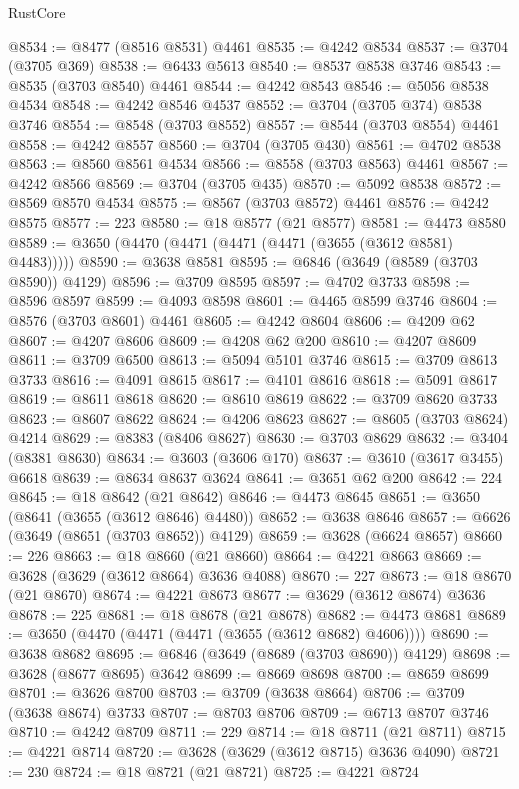 \begin{lexlean}{RustCore}
\begin{coremodule}
@8534 := @8477 (@8516 @8531) @4461
@8535 := @4242 @8534
@8537 := @3704 (@3705 @369)
@8538 := @6433 @5613
@8540 := @8537 @8538 @3746
@8543 := @8535 (@3703 @8540) @4461
@8544 := @4242 @8543
@8546 := @5056 @8538 @4534
@8548 := @4242 @8546 @4537
@8552 := @3704 (@3705 @374) @8538 @3746
@8554 := @8548 (@3703 @8552)
@8557 := @8544 (@3703 @8554) @4461
@8558 := @4242 @8557
@8560 := @3704 (@3705 @430)
@8561 := @4702 @8538
@8563 := @8560 @8561 @4534
@8566 := @8558 (@3703 @8563) @4461
@8567 := @4242 @8566
@8569 := @3704 (@3705 @435)
@8570 := @5092 @8538
@8572 := @8569 @8570 @4534
@8575 := @8567 (@3703 @8572) @4461
@8576 := @4242 @8575
@8577 := 223
@8580 := @18 @8577 (@21 @8577)
@8581 := @4473 @8580
@8589 := @3650 (@4470 (@4471 (@4471 (@4471 (@3655 (@3612 @8581) @4483)))))
@8590 := @3638 @8581
@8595 := @6846 (@3649 (@8589 (@3703 @8590)) @4129)
@8596 := @3709 @8595
@8597 := @4702 @3733
@8598 := @8596 @8597
@8599 := @4093 @8598
@8601 := @4465 @8599 @3746
@8604 := @8576 (@3703 @8601) @4461
@8605 := @4242 @8604
@8606 := @4209 @62
@8607 := @4207 @8606
@8609 := @4208 @62 @200
@8610 := @4207 @8609
@8611 := @3709 @6500
@8613 := @5094 @5101 @3746
@8615 := @3709 @8613 @3733
@8616 := @4091 @8615
@8617 := @4101 @8616
@8618 := @5091 @8617
@8619 := @8611 @8618
@8620 := @8610 @8619
@8622 := @3709 @8620 @3733
@8623 := @8607 @8622
@8624 := @4206 @8623
@8627 := @8605 (@3703 @8624) @4214
@8629 := @8383 (@8406 @8627)
@8630 := @3703 @8629
@8632 := @3404 (@8381 @8630)
@8634 := @3603 (@3606 @170)
@8637 := @3610 (@3617 @3455) @6618
@8639 := @8634 @8637 @3624
@8641 := @3651 @62 @200
@8642 := 224
@8645 := @18 @8642 (@21 @8642)
@8646 := @4473 @8645
@8651 := @3650 (@8641 (@3655 (@3612 @8646) @4480))
@8652 := @3638 @8646
@8657 := @6626 (@3649 (@8651 (@3703 @8652)) @4129)
@8659 := @3628 (@6624 @8657)
@8660 := 226
@8663 := @18 @8660 (@21 @8660)
@8664 := @4221 @8663
@8669 := @3628 (@3629 (@3612 @8664) @3636 @4088)
@8670 := 227
@8673 := @18 @8670 (@21 @8670)
@8674 := @4221 @8673
@8677 := @3629 (@3612 @8674) @3636
@8678 := 225
@8681 := @18 @8678 (@21 @8678)
@8682 := @4473 @8681
@8689 := @3650 (@4470 (@4471 (@4471 (@3655 (@3612 @8682) @4606))))
@8690 := @3638 @8682
@8695 := @6846 (@3649 (@8689 (@3703 @8690)) @4129)
@8698 := @3628 (@8677 @8695) @3642
@8699 := @8669 @8698
@8700 := @8659 @8699
@8701 := @3626 @8700
@8703 := @3709 (@3638 @8664)
@8706 := @3709 (@3638 @8674) @3733
@8707 := @8703 @8706
@8709 := @6713 @8707 @3746
@8710 := @4242 @8709
@8711 := 229
@8714 := @18 @8711 (@21 @8711)
@8715 := @4221 @8714
@8720 := @3628 (@3629 (@3612 @8715) @3636 @4090)
@8721 := 230
@8724 := @18 @8721 (@21 @8721)
@8725 := @4221 @8724

\end{coremodule}
\end{lexlean}
